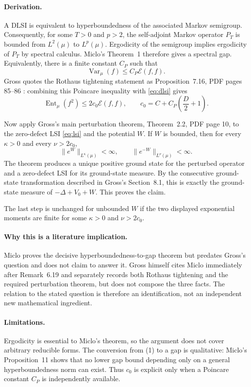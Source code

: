 \documentclass[11pt]{article}
\begin{document}
\paragraph{Derivation.}
A DLSI is equivalent to hyperboundedness of the associated Markov semigroup.
Consequently, for some $T>0$ and $p>2$, the self-adjoint Markov operator
$P_T$ is bounded from $L^2(\mu)$ to $L^p(\mu)$.  Ergodicity of the semigroup
implies ergodicity of $P_T$ by spectral calculus.  Miclo's Theorem~1
\cite{Miclo} therefore gives a spectral gap.  Equivalently, there is a finite
constant $C_P$ such that
\[
 \operatorname{Var}_{\mu}(f)\leq C_P\mathcal E(f,f).
\]
Gross quotes the Rothaus tightening statement as Proposition~7.16, PDF
pages 85--86 \cite{Gross}: combining this Poincare inequality with
\eqref{eq:dlsi} gives
\begin{equation}
 \operatorname{Ent}_{\mu}(f^2)
 \leq 2c_0\mathcal E(f,f),
 \qquad c_0=C+C_P\left(\frac D2+1\right).
 \label{eq:lsi}
\end{equation}

Now apply Gross's main perturbation theorem, Theorem~2.2, PDF page 10, to
the zero-defect LSI \eqref{eq:lsi} and the potential $W$.  If $W$ is bounded, then for
every $\kappa>0$ and every $\nu>2c_0$,
\[
 \lVert e^W\rVert_{L^\kappa(\mu)}<\infty,
 \qquad
 \lVert e^{-W}\rVert_{L^\nu(\mu)}<\infty.
\]
The theorem produces a unique positive ground state for the perturbed
operator and a zero-defect LSI for its ground-state measure.  By the
consecutive ground-state transformation described in Gross's Section~8.1,
this is exactly the ground-state measure of $-\Delta+V_0+W$.  This proves the
claim.

The last step is unchanged for unbounded $W$ if the two displayed exponential
moments are finite for some $\kappa>0$ and $\nu>2c_0$.

\paragraph{Why this is a literature implication.}
Miclo proves the decisive hyperboundedness-to-gap theorem but predates
Gross's question and does not claim to answer it.  Gross himself cites Miclo
immediately after Remark~6.19 and separately records both Rothaus tightening
and the required perturbation theorem, but does not compose the three facts.
The relation to the stated question is therefore an identification, not an
independent new mathematical ingredient.

\paragraph{Limitations.}
Ergodicity is essential to Miclo's theorem, so the argument does not cover
arbitrary reducible forms.  The conversion from (1) to a gap is qualitative:
Miclo's Proposition~11 shows that no lower gap bound depending only on a
general hyperboundedness norm can exist.  Thus $c_0$ is explicit only when a
Poincare constant $C_P$ is independently available.
\end{document}
